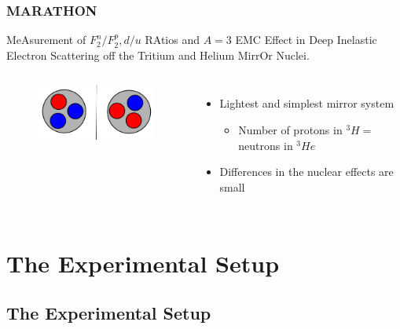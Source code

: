 \documentclass[12pt]{beamer}
\begin{document}
\begin{frame}
\frametitle{MARATHON}
\vspace{-10pt}
\begin{block}{}
MeAsurement of $F^n_2/F^p_2, d/u$ RAtios and $A=3$ EMC Effect in Deep Inelastic Electron Scattering off the Tritium and Helium MirrOr Nuclei.
\vspace{-10pt}
\begin{columns}[t]
	
	\vspace{-10pt}	
	\hspace{-10pt}
	\begin{figure}
		\includegraphics[width =5cm]{../images/mirror}
	\end{figure}
	
	\vspace{10pt}
	\begin{itemize}
		\item Lightest and simplest mirror system
		\begin{itemize}
			\item  Number of protons in $^3H =$ neutrons in $^3He$
		\end{itemize}
		\item Differences in the nuclear effects are small
	\end{itemize}
	
	
\end{columns}
\end{block}
\end{frame}

\section[Experiment]{The Experimental Setup}
\subsection[Equipment]{The Experimental Setup}
\end{document}

